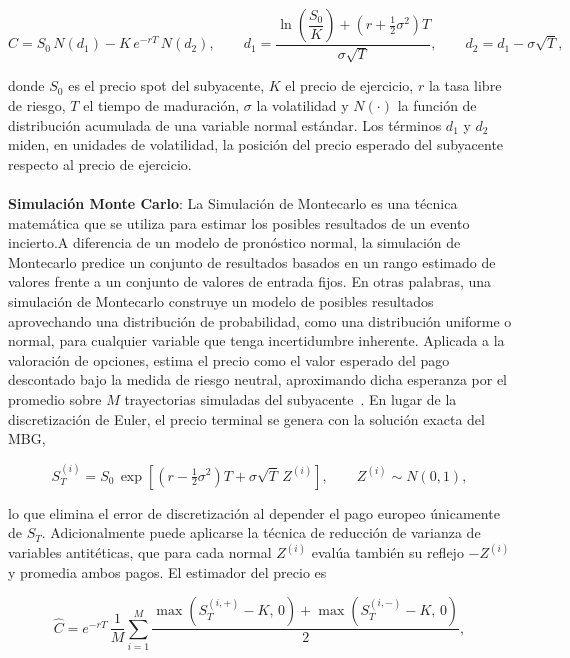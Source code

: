 \documentclass{article}
\begin{document}
\begin{equation}
C=S_0\,N(d_1)-K\,e^{-rT}\,N(d_2),
\qquad
d_1=\frac{\ln\!\left(\dfrac{S_0}{K}\right)+\left(r+\tfrac{1}{2}\sigma^2\right)T}{\sigma\sqrt{T}},
\qquad
d_2=d_1-\sigma\sqrt{T},
\label{eq:bs}
\end{equation}

donde $S_0$ es el precio spot del subyacente, $K$ el precio de ejercicio, $r$ la tasa libre de riesgo, $T$ el tiempo de maduración, $\sigma$ la volatilidad y $N(\cdot)$ la función de distribución acumulada de una variable normal estándar. Los términos $d_1$ y $d_2$ miden, en unidades de volatilidad, la posición del precio esperado del subyacente respecto al precio de ejercicio.
\\
\\
\textbf{Simulación Monte Carlo}: La Simulación de Montecarlo es una técnica matemática que se utiliza para estimar los posibles resultados de un evento incierto\cite{ibm_montecarlo}.A diferencia de un modelo de pronóstico normal, la simulación de Montecarlo predice un conjunto de resultados basados en un rango estimado de valores frente a un conjunto de valores de entrada fijos. En otras palabras, una simulación de Montecarlo construye un modelo de posibles resultados aprovechando una distribución de probabilidad, como una distribución uniforme o normal, para cualquier variable que tenga incertidumbre inherente. Aplicada a la valoración de opciones, estima el precio como el valor esperado del pago descontado bajo la medida de riesgo neutral, aproximando dicha esperanza por el promedio sobre $M$ trayectorias simuladas del subyacente~\cite{marin2025metodos}. En lugar de la discretización de Euler, el precio terminal se genera con la solución exacta del MBG,

\begin{equation}
S_T^{(i)}=S_0\,\exp\!\left[\left(r-\tfrac{1}{2}\sigma^2\right)T+\sigma\sqrt{T}\,Z^{(i)}\right],
\qquad Z^{(i)}\sim N(0,1),
\label{eq:mc_st}
\end{equation}

lo que elimina el error de discretización al depender el pago europeo únicamente de $S_T$. Adicionalmente puede aplicarse la técnica de reducción de varianza de variables antitéticas, que para cada normal $Z^{(i)}$ evalúa también su reflejo $-Z^{(i)}$ y promedia ambos pagos. El estimador del precio es

\begin{equation}
\widehat{C}=e^{-rT}\,\frac{1}{M}\sum_{i=1}^{M}
\frac{\max\!\left(S_T^{(i,+)}-K,\,0\right)+\max\!\left(S_T^{(i,-)}-K,\,0\right)}{2},
\label{eq:mc_precio}
\end{equation}
\end{document}
